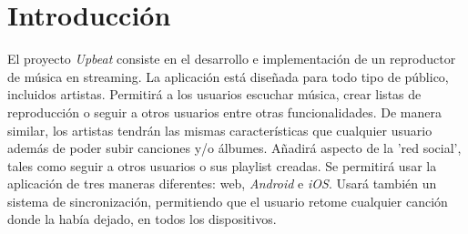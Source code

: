 \documentclass{article}
\begin{document}
\maketitle
\newpage
\section*{Introducción}
El proyecto \textit{Upbeat} consiste en el desarrollo e implementación de un reproductor de música en streaming.
\hfill \break
La aplicación está diseñada para todo tipo de público, incluidos artistas. Permitirá a los usuarios escuchar música, crear listas de reproducción o seguir a otros usuarios entre otras funcionalidades.
\hfill \break
De manera similar, los artistas tendrán las mismas características que cualquier usuario además de poder subir canciones y/o álbumes.
\hfill \break
Añadirá aspecto de la 'red social', tales como seguir a otros usuarios o sus playlist creadas.
\hfill \break
Se permitirá usar la aplicación de tres maneras diferentes: web, \textit{Android} e \textit{iOS}.
Usará también un sistema de sincronización, permitiendo que el usuario retome cualquier canción donde la había dejado, en todos los dispositivos.

\newpage
\tableofcontents %
{}
\newpage
\pagestyle{fancy}
\end{document}
